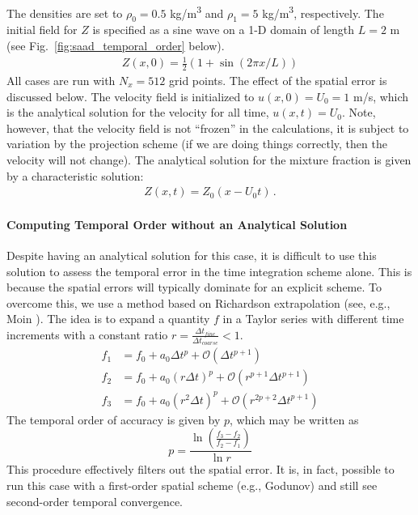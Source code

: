 \documentclass[11pt]{book}
\begin{document}
\noindent The densities are set to $\rho_0 = 0.5$ \si{kg/m^3} and $\rho_1 = 5$ \si{kg/m^3}, respectively.  The initial field for $Z$ is specified as a sine wave on a 1-D domain of length $L=2$ m (see Fig.~\ref{fig:saad_temporal_order} below).
\begin{align}
Z(x,0) = \frac{1}{2}\left( 1 + \sin(2\pi x/L) \right)
\end{align}
All cases are run with $N_x = 512$ grid points.  The effect of the spatial error is discussed below. The velocity field is initialized to $u(x,0) = U_0 = 1$ m/s, which is the analytical solution for the velocity for all time, $u(x,t) = U_0$.  Note, however, that the velocity field is not ``frozen'' in the calculations, it is subject to variation by the projection scheme (if we are doing things correctly, then the velocity will not change).  The analytical solution for the mixture fraction is given by a characteristic solution:
\begin{align}
Z(x,t) = Z_0(x-U_0 t) \,\mbox{.}
\end{align}

\paragraph{Computing Temporal Order without an Analytical Solution}

Despite having an analytical solution for this case, it is difficult to use this solution to assess the temporal error in the time integration scheme alone.  This is because the spatial errors will typically dominate for an explicit scheme.  To overcome this, we use a method based on Richardson extrapolation (see, e.g., Moin \cite{Moin:2001}).  The idea is to expand a quantity $f$ in a Taylor series with different time increments with a constant ratio $r = \frac{\Delta t_{fine}}{\Delta t_{coarse}} < 1$.
\begin{align}
f_1 &= f_0 + a_0 \Delta t^p + \mathcal{O}(\Delta t^{p+1}) \\
f_2 &= f_0 + a_0 (r \Delta t)^p + \mathcal{O}(r^{p+1} \Delta t^{p+1}) \\
f_3 &= f_0 + a_0 (r^2 \Delta t)^p + \mathcal{O}(r^{2p+2} \Delta t^{p+1})
\end{align}
The temporal order of accuracy is given by $p$, which may be written as
\begin{equation}
\label{eq:temporal_order}
p = \frac{\ln \left(\frac{f_3-f_2}{f_2-f_1}\right)}{\ln r}
\end{equation}
This procedure effectively filters out the spatial error.  It is, in fact, possible to run this case with a first-order spatial scheme (e.g., Godunov) and still see second-order temporal convergence.
\end{document}
